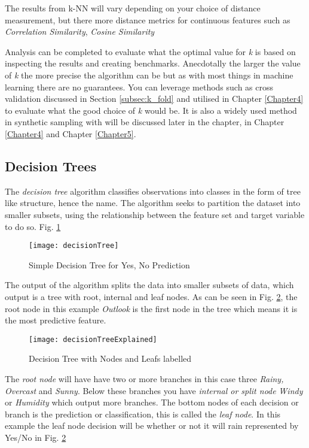 The results from k-NN will vary depending on your choice of distance measurement, but there more distance metrics for continuous features such as \textit{Correlation Similarity}, \textit{Cosine Similarity} \citep{sarwar_item-based_2001}

Analysis can be completed to evaluate what the optimal value for \textit{k} is based on inspecting the results and creating benchmarks. Anecdotally the larger the value of \textit{k} the more precise the algorithm can be but as with most things in machine learning there are no guarantees. You can leverage methods such as cross validation discussed in Section \ref{subsec:k_fold} and utilised in Chapter \ref{Chapter4} to evaluate what the good choice of \textit{k} would be. It is also a widely used method in synthetic sampling with will be discussed later in the chapter, in Chapter \ref{Chapter4} and Chapter \ref{Chapter5}.

\subsection{Decision Trees} \label{decTrees}
The \textit{decision tree} algorithm classifies observations into classes in the form of tree like structure, hence the name. The algorithm seeks to partition the dataset into smaller subsets, using the relationship between the feature set and target variable to do so. Fig. \ref{fig:decisionTree}

\begin{figure}[H]
	\texttt{[image: decisionTree]}
	\caption{Simple Decision Tree for Yes, No Prediction \\ \cite[Source:][]{quinlan_induction_1986}}
	\label{fig:decisionTree}
\end{figure}

The output of the algorithm splits the data into smaller subsets of data, which output is a tree with root, internal and leaf nodes. As can be seen in Fig. \ref{fig:decisionTreeExplained}, the root node in this example \textit{Outlook} is the first node in the tree which means it is the most predictive feature. 

\begin{figure}[H]
	\texttt{[image: decisionTreeExplained]}
	\caption{Decision Tree with Nodes and Leafs labelled}
	\label{fig:decisionTreeExplained}
\end{figure}

The \textit{root node} will have have two or more branches in this case three \textit{Rainy, Overcast} and \textit{Sunny}. Below these branches you have \textit{internal or split node} \textit{Windy} or \textit{Humidity} which output more branches. The bottom nodes of each decision or branch is the prediction or classification, this is called the \textit{leaf node}. In this example the leaf node decision will be whether or not it will rain represented by Yes/No in Fig. \ref{fig:decisionTreeExplained}

